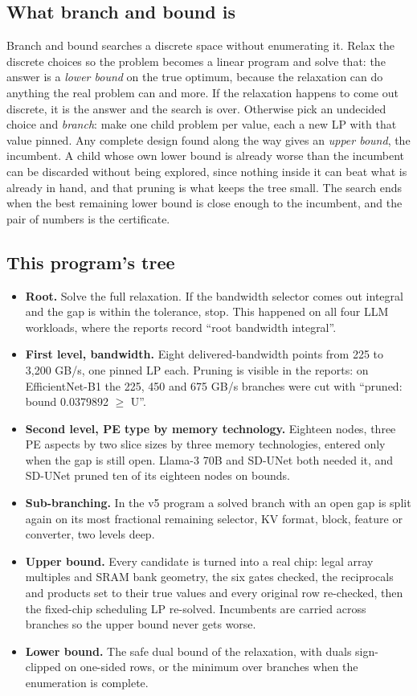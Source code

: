 \documentclass[10pt]{article}
\newenvironment{tight}
  {\begin{itemize}[leftmargin=13pt,itemsep=4pt,topsep=4pt,parsep=0pt,
     label=\textcolor{ink3}{\footnotesize$\bullet$}]\color{ink2}}
  {\end{itemize}}
\begin{document}
\subsection{What branch and bound is}
{\color{ink2}Branch and bound searches a discrete space without enumerating it.
Relax the discrete choices so the problem becomes a linear program and solve
that: the answer is a \emph{lower bound} on the true optimum, because the
relaxation can do anything the real problem can and more. If the relaxation
happens to come out discrete, it is the answer and the search is over.
Otherwise pick an undecided choice and \emph{branch}: make one child problem
per value, each a new LP with that value pinned. Any complete design found
along the way gives an \emph{upper bound}, the incumbent. A child whose own
lower bound is already worse than the incumbent can be discarded without being
explored, since nothing inside it can beat what is already in hand, and that
pruning is what keeps the tree small. The search ends when the best remaining
lower bound is close enough to the incumbent, and the pair of numbers is the
certificate.\par}

\subsection{This program's tree}
\begin{tight}
\item \textbf{\color{ink}Root.} Solve the full relaxation. If the bandwidth
selector comes out integral and the gap is within the tolerance, stop. This
happened on all four LLM workloads, where the reports record ``root bandwidth
integral''.
\item \textbf{\color{ink}First level, bandwidth.} Eight delivered-bandwidth
points from 225 to 3,200 GB/s, one pinned LP each. Pruning is visible in the
reports: on EfficientNet-B1 the 225, 450 and 675 GB/s branches were cut with
``pruned: bound 0.0379892 $\ge$ U''.
\item \textbf{\color{ink}Second level, PE type by memory technology.} Eighteen
nodes, three PE aspects by two slice sizes by three memory technologies,
entered only when the gap is still open. Llama-3 70B and SD-UNet both needed
it, and SD-UNet pruned ten of its eighteen nodes on bounds.
\item \textbf{\color{ink}Sub-branching.} In the v5 program a solved branch with
an open gap is split again on its most fractional remaining selector, KV
format, block, feature or converter, two levels deep.
\item \textbf{\color{ink}Upper bound.} Every candidate is turned into a real
chip: legal array multiples and SRAM bank geometry, the six gates checked, the
reciprocals and products set to their true values and every original row
re-checked, then the fixed-chip scheduling LP re-solved. Incumbents are carried
across branches so the upper bound never gets worse.
\item \textbf{\color{ink}Lower bound.} The safe dual bound of the relaxation,
with duals sign-clipped on one-sided rows, or the minimum over branches when
the enumeration is complete.
\end{tight}
\end{document}
